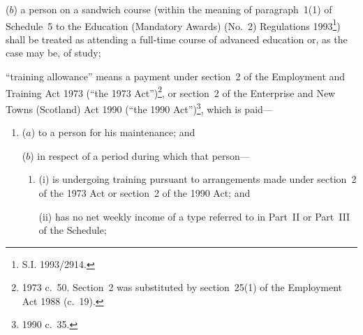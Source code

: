 \documentclass[12pt,a4paper]{article}
\begin{document}
\begin{enumerate}
\begin{enumerate}
($b$) 
a person on a sandwich course (within the meaning of paragraph~1(1) of Schedule~5 to the Education (Mandatory Awards) (No.\ 2) Regulations 1993\footnote{\frenchspacing S.I. 1993/2914.}) shall be treated as attending a full-time course of advanced education or, as the case may be, of study;
\end{enumerate}


“training allowance” means a payment under section~2 of the Employment and Training Act 1973 (“the 1973 Act”)\footnote{1973 c.\ 50. Section~2 was substituted by section~25(1) of the Employment Act 1988 (c.\ 19).}, or section~2 of the Enterprise and New Towns (Scotland) Act 1990 (“the 1990 Act”)\footnote{1990 c.\ 35.}, which is paid—
\begin{enumerate}\item[]
($a$) 
to a person for his maintenance; and

($b$) 
in respect of a period during which that person—
\begin{enumerate}\item[]
(i) 
is undergoing training pursuant to arrangements made under section~2 of the 1973 Act or section~2 of the 1990 Act; and

(ii) 
has no net weekly income of a type referred to in Part~II or Part~III of the Schedule;
\end{enumerate}
\end{enumerate}


\end{enumerate}
\end{document}
